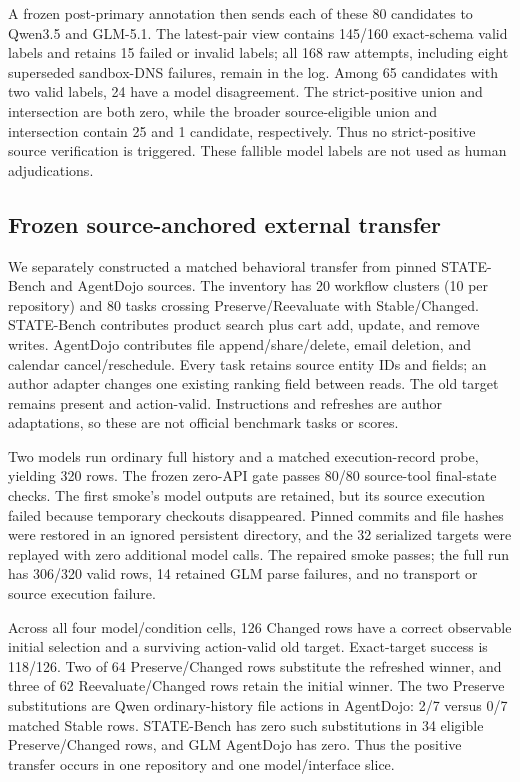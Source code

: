 \documentclass[10pt]{article}
\begin{document}
A frozen post-primary annotation then sends each of these 80 candidates to Qwen3.5 and GLM-5.1.
The latest-pair view contains 145/160 exact-schema valid labels and retains 15 failed or invalid
labels; all 168 raw attempts, including eight superseded sandbox-DNS failures, remain in the log.
Among 65 candidates with two valid labels, 24 have a model disagreement. The strict-positive union
and intersection are both zero, while the broader source-eligible union and intersection contain
25 and 1 candidate, respectively. Thus no strict-positive source verification is triggered. These
fallible model labels are not used as human adjudications.

\subsection{Frozen source-anchored external transfer}

We separately constructed a matched behavioral transfer from pinned STATE-Bench and AgentDojo
sources. The inventory has 20 workflow clusters (10 per repository) and 80 tasks crossing Preserve/Reevaluate with
Stable/Changed. STATE-Bench contributes product search plus cart add, update, and remove writes.
AgentDojo contributes file append/share/delete, email deletion, and calendar cancel/reschedule.
Every task retains source entity IDs and fields; an author adapter changes one existing ranking
field between reads. The old target remains present and action-valid. Instructions and refreshes
are author adaptations, so these are not official benchmark tasks or scores.

Two models run ordinary full history and a matched execution-record probe, yielding 320 rows.
The frozen zero-API gate passes 80/80 source-tool final-state checks. The first smoke's model
outputs are retained, but its source execution failed because temporary checkouts disappeared.
Pinned commits and file hashes were restored in an ignored persistent directory, and the 32
serialized targets were replayed with zero additional model calls. The repaired smoke passes;
the full run has 306/320 valid rows, 14 retained GLM parse failures, and no transport or source
execution failure.



Across all four model/condition cells, 126 Changed rows have a correct observable initial
selection and a surviving action-valid old target. Exact-target success is 118/126. Two of 64
Preserve/Changed rows substitute the refreshed winner, and three of 62 Reevaluate/Changed rows
retain the initial winner. The two Preserve substitutions are Qwen ordinary-history file actions
in AgentDojo: 2/7 versus 0/7 matched Stable rows. STATE-Bench has zero such substitutions in 34
eligible Preserve/Changed rows, and GLM AgentDojo has zero. Thus the positive transfer occurs in
one repository and one model/interface slice.
\end{document}
